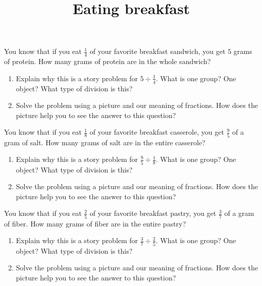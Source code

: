 \documentclass[nooutcomes,noauthor]{ximera}
\title{Eating breakfast}
\begin{document}
\begin{abstract}
\end{abstract}

\maketitle

\begin{problem}
You know that if you eat $\frac{1}{4}$ of your favorite breakfast sandwich, you get $5$ grams of protein. How many grams of protein are in the whole sandwich?

\begin{enumerate}
	\item Explain why this is a story problem for $5 \div \frac{1}{4}$. What is one group? One object? What type of division is this?
	\item Solve the problem using a picture and our meaning of fractions. How does the picture help you to see the answer to this question?
\end{enumerate}


\end{problem}



\begin{problem}
You know that if you eat $\frac{1}{8}$ of your favorite breakfast casserole, you get $\frac{9}{5}$ of a gram of salt. How many grams of salt are in the entire casserole? 

\begin{enumerate}
	\item Explain why this is a story problem for $\frac{9}{5} \div \frac{1}{8}$. What is one group? One object? What type of division is this?
	\item Solve the problem using a picture and our meaning of fractions. How does the picture help you to see the answer to this question?
\end{enumerate}
\end{problem}



\begin{problem}
You know that if you eat $\frac{2}{5}$ of your favorite breakfast pastry, you get $\frac{3}{7}$ of a gram of fiber. How many grams of fiber are in the entire pastry?

\begin{enumerate}
	\item Explain why this is a story problem for $\frac{3}{7} \div \frac{2}{5}$. What is one group? One object? What type of division is this?
	\item Solve the problem using a picture and our meaning of fractions. How does the picture help you to see the answer to this question?
\end{enumerate}
\end{problem}
\end{document}
